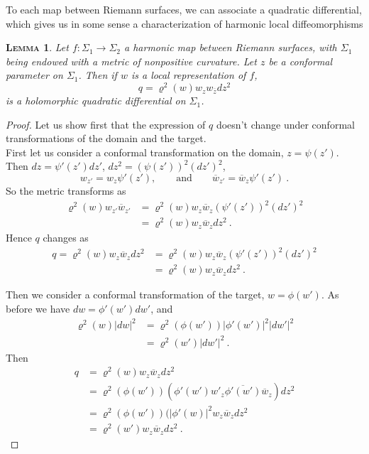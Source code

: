 \documentclass[a4paper,11pt,openright,twoside]{book}
\renewcommand{\rho}{\varrho}
\newcommand{\1}{\mathds{1}}
\theoremstyle{plain}
\newtheorem{lemma}[thm]{\textsc{Lemma}}
\theoremstyle{definition}
\theoremstyle{remark}
\begin{document}
To each map between Riemann surfaces, we can associate a quadratic differential, which gives us in some sense a characterization of harmonic local diffeomorphisms
\begin{lemma}\label{lm:exholdiff}
	Let $f:\Sigma_1\to \Sigma_2$ a harmonic map between Riemann surfaces, with $\Sigma_1$ being endowed with a metric of nonpositive curvature. Let $z$ be a conformal parameter on $\Sigma_1$. Then if $w$ is a local representation of $f$,
	\[q = \rho^2(w) w_zw_{\overline{z}} dz^2\] is a holomorphic quadratic differential on $\Sigma_1$.
\end{lemma}
\begin{proof}
	Let us show first that the expression of $q$ doesn't change under conformal transformations of the domain and the target.\\

	First let us consider a conformal transformation on the domain, $z=\psi(z')$. Then $dz=\psi'(z') dz'$, $dz^2 =(\psi(z'))^2 (dz')^2$, 
	\[w_{z'}=w_z \psi'(z'),\qquad\text{and}\qquad \overline{w}_{z'}=\overline{w}_z\psi'(z')\ .\] 
	So the metric transforms as
	 \begin{align*}
		\rho^2(w)w_{z'}\overline{w}_{z'}  &= \rho^2(w)w_{z}\overline{w}_{z}(\psi'(z'))^2 (dz') ^2 \\
		&= \rho^2(w)w_z \overline{w}_z dz^2
	\ . 
	\end{align*}
	Hence $q$ changes as 
	\begin{align*}
		q = \rho^2(w)w_z\overline{w}_z dz^2 &= \rho^2(w) w_z \overline{w}_z(\psi'(z'))^2 (dz') ^2 \\
		&= \rho^2(w) w_z \overline{w}_z dz^2 
	\ . 
	\end{align*}

	Then we consider a conformal transformation of the target, $w = \phi(w')$. As before we have $dw = \phi'(w') dw'$, and
	\begin{align*}
		\rho^2(w)|dw|^2 &= \rho^2(\phi(w'))|\phi'(w')|^2|dw'|^2 \\
		&= \rho^2(w')|dw'|^2 
	\ . 
	\end{align*}
	Then
	\begin{align*}
		q &= \rho^2(w)w_z \overline{w}_z dz^2  \\
		  &= \rho^2(\phi(w'))(\phi'(w')w'_z \overline{\phi'(w')}\overline{w}_z) dz^2 \\
		  &= \rho^2(\phi(w'))(|\phi'(w)|^2w_z\overline{w}_zdz^2 \\
		  &= \rho^2(w')w_z\overline{w}_zdz^2
	\ . 
	\end{align*}


\end{proof}
\end{document}
